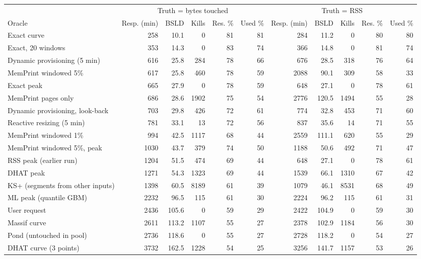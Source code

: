 \begin{tabular}{lrrrrrrrrrr}
\toprule
 & \multicolumn{5}{c}{Truth = bytes touched} & \multicolumn{5}{c}{Truth = RSS} \\
\cmidrule(lr){2-6} \cmidrule(lr){7-11}
Oracle & Resp. (min) & BSLD & Kills & Res. \% & Used \% & Resp. (min) & BSLD & Kills & Res. \% & Used \% \\
\midrule
Exact curve & 258 & 10.1 & 0 & 81 & 81 & 284 & 11.2 & 0 & 80 & 80 \\
Exact, 20 windows & 353 & 14.3 & 0 & 83 & 74 & 366 & 14.8 & 0 & 81 & 74 \\
Dynamic provisioning (5 min) & 616 & 25.8 & 284 & 78 & 66 & 676 & 28.5 & 318 & 76 & 64 \\
MemPrint windowed 5\% & 617 & 25.8 & 460 & 78 & 59 & 2088 & 90.1 & 309 & 58 & 33 \\
Exact peak & 665 & 27.9 & 0 & 78 & 59 & 648 & 27.1 & 0 & 78 & 61 \\
MemPrint pages only & 686 & 28.6 & 1902 & 75 & 54 & 2776 & 120.5 & 1494 & 55 & 28 \\
Dynamic provisioning, look-back & 703 & 29.8 & 426 & 72 & 61 & 774 & 32.8 & 453 & 71 & 60 \\
Reactive resizing (5 min) & 781 & 33.1 & 13 & 72 & 56 & 837 & 35.6 & 14 & 71 & 55 \\
MemPrint windowed 1\% & 994 & 42.5 & 1117 & 68 & 44 & 2559 & 111.1 & 620 & 55 & 29 \\
MemPrint windowed 5\%, peak & 1030 & 43.7 & 379 & 74 & 50 & 1188 & 50.6 & 492 & 71 & 47 \\
RSS peak (earlier run) & 1204 & 51.5 & 474 & 69 & 44 & 648 & 27.1 & 0 & 78 & 61 \\
DHAT peak & 1271 & 54.3 & 1323 & 69 & 44 & 1539 & 66.1 & 1310 & 67 & 42 \\
KS+ (segments from other inputs) & 1398 & 60.5 & 8189 & 61 & 39 & 1079 & 46.1 & 8531 & 68 & 49 \\
ML peak (quantile GBM) & 2232 & 96.5 & 115 & 61 & 30 & 2224 & 96.2 & 115 & 61 & 31 \\
User request & 2436 & 105.6 & 0 & 59 & 29 & 2422 & 104.9 & 0 & 59 & 30 \\
Massif curve & 2611 & 113.2 & 1107 & 55 & 27 & 2378 & 102.9 & 1184 & 56 & 30 \\
Pond (untouched in pool) & 2736 & 118.6 & 0 & 55 & 27 & 2728 & 118.2 & 0 & 54 & 27 \\
DHAT curve (3 points) & 3732 & 162.5 & 1228 & 54 & 25 & 3256 & 141.7 & 1157 & 53 & 26 \\

\end{tabular}
